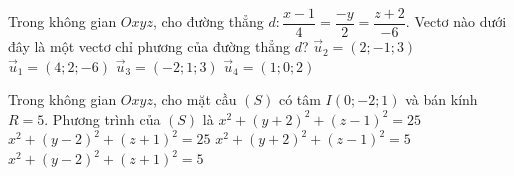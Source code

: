 \begin{ex}%
	Trong không gian $Oxyz$, cho đường thẳng $d\colon\dfrac{x-1}{4}=\dfrac{-y}{2}=\dfrac{z+2}{-6}$. Vectơ nào dưới đây là một vectơ chỉ phương của đường thẳng $d$?
	\choice
	{$\overrightarrow{u}_2=(2;-1;3)$}
	{$\overrightarrow{u}_1=(4;2;-6)$}
	{\True $\overrightarrow{u}_3=(-2;1;3)$}
	{$\overrightarrow{u}_4=(1;0;2)$}
\end{ex}

\begin{ex}%
	Trong không gian $Oxyz$, cho mặt cầu $(S)$ có tâm $I(0;-2;1)$ và bán kính $R=5$. Phương trình của $(S)$ là
	\choice
	{\True $x^2+(y+2)^2+(z-1)^2=25$}
	{$x^2+(y-2)^2+(z+1)^2=25$}
	{$x^2+(y+2)^2+(z-1)^2=5$}
	{$x^2+(y-2)^2+(z+1)^2=5$}
\end{ex}